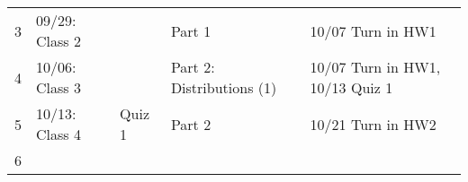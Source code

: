 \documentclass[
]{book}
\begin{document}
\begin{longtable}[]{@{}lllll@{}}
\begin{minipage}[t]{0.08\columnwidth}
3\strut
\end{minipage} & \begin{minipage}[t]{0.17\columnwidth}\raggedright
09/29: Class 2\strut
\end{minipage} & \begin{minipage}[t]{0.08\columnwidth}\raggedright
\strut
\end{minipage} & \begin{minipage}[t]{0.32\columnwidth}\raggedright
Part 1\strut
\end{minipage} & \begin{minipage}[t]{0.22\columnwidth}\raggedright
10/07 Turn in HW1\strut
\end{minipage}\tabularnewline
\begin{minipage}[t]{0.08\columnwidth}\raggedright
4\strut
\end{minipage} & \begin{minipage}[t]{0.17\columnwidth}\raggedright
10/06: Class 3\strut
\end{minipage} & \begin{minipage}[t]{0.08\columnwidth}\raggedright
\strut
\end{minipage} & \begin{minipage}[t]{0.32\columnwidth}\raggedright
Part 2: Distributions (1)\strut
\end{minipage} & \begin{minipage}[t]{0.22\columnwidth}\raggedright
10/07 Turn in HW1, 10/13 Quiz 1\strut
\end{minipage}\tabularnewline
\begin{minipage}[t]{0.08\columnwidth}\raggedright
5\strut
\end{minipage} & \begin{minipage}[t]{0.17\columnwidth}\raggedright
10/13: Class 4\strut
\end{minipage} & \begin{minipage}[t]{0.08\columnwidth}\raggedright
Quiz 1\strut
\end{minipage} & \begin{minipage}[t]{0.32\columnwidth}\raggedright
Part 2\strut
\end{minipage} & \begin{minipage}[t]{0.22\columnwidth}\raggedright
10/21 Turn in HW2\strut
\end{minipage}\tabularnewline
\begin{minipage}[t]{0.08\columnwidth}\raggedright
6\strut
\end{minipage} & \begin{minipage}[t]{0.17\columnwidth}\raggedright

\end{minipage}
\end{longtable}
\end{document}
